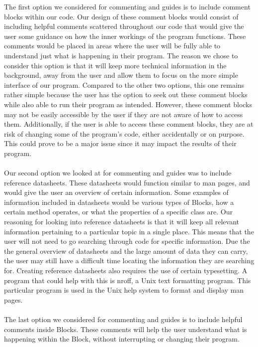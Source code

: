 \documentclass[journal,10pt,onecolumn,compsoc]{IEEEtran} \usepackage[margin=1.0in]{geometry} \usepackage{pdfpages} \usepackage{graphicx}
\begin{document}
\noindent The first option we considered for commenting and guides is to include comment blocks within our code. 
Our design of these comment blocks would consist of including helpful comments scattered throughout our code that would give the user some guidance on how the inner workings of the program functions. 
These comments would be placed in areas where the user will be fully able to understand just what is happening in their program. 
The reason we chose to consider this option is that it will keep more technical information in the background, away from the user and allow them to focus on the more simple interface of our program. 
Compared to the other two options, this one remains rather simple because the user has the option to seek out these comment blocks while also able to run their program as intended. 
However, these comment blocks may not be easily accessible by the user if they are not aware of how to access them. 
Additionally, if the user is able to access these comment blocks, they are at risk of changing some of the program's code, either accidentally or on purpose. 
This could prove to be a major issue since it may impact the results of their program. 
\\
\\
\noindent Our second option we looked at for commenting and guides was to include reference datasheets. 
These datasheets would function similar to man pages, and would give the user an overview of certain information. 
Some examples of information included in datasheets would be various types of Blocks, how a certain method operates, or what the properties of a specific class are. 
Our reasoning for looking into reference datasheets is that it will keep all relevant information pertaining to a particular topic in a single place. 
This means that the user will not need to go searching through code for specific information. 
Due the the general overview of datasheets and the large amount of data they can carry, the user may still have a difficult time locating the information they are searching for. 
Creating reference datasheets also requires the use of certain typesetting. 
A program that could help with this is nroff, a Unix text formatting program. 
This particular program is used in the Unix help system to format and display man pages. \cite{armstrong}
\\
\\
\noindent The last option we considered for commenting and guides is to include helpful comments inside Blocks. 
These comments will help the user understand what is happening within the Block, without interrupting or changing their program. 
\end{document}
